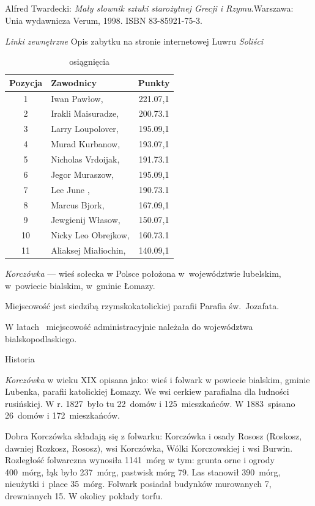 \documentclass[a4paper,12pt]{article}
\begin{document}
\subsection{}\label{sec:tekst} 
Alfred Twardecki: \emph {Mały słownik sztuki starożytnej Grecji i Rzymu}.Warszawa: Unia wydawnicza Verum, 1998. ISBN 83-85921-75-3.

\emph{Linki zewnętrzne}
Opis zabytku na stronie internetowej Luwru
\emph{Soliści}
\begin{table}[h]
\begin{tabular}{clc}
\hline
\textbf{Pozycja}&\textbf{Zawodnicy}&\textbf{Punkty}\\
\hline
1&Iwan Pawłow{,}&221.07{,}1\\
2&Irakli Maisuradze{,}&200.73{.}1\\
3&Larry Loupolover{,}&195.09{,}1\\
4&Murad Kurbanow{,}&193.07{,}1\\
5&Nicholas Vrdoijak{,}&191.73{.}1\\
6&Jegor Muraszow{,}&195.09{,}1\\
7&Lee June {,}&190.73{.}1\\
8&Marcus Bjork{,}&167.09{,}1\\
9&Jewgienij Własow{,}&150.07{,}1\\
10&Nicky Leo Obrejkow{,}&160.73{.}1\\
11&Aliaksej Miałiochin{,}&140.09{,}1\\
\hline
\end{tabular}
\caption{osiągnięcia}
\end{table}

\emph{Korczówka} --- wieś sołecka w Polsce położona w~województwie lubelskim, w~powiecie bialskim, w~gminie Łomazy.

Miejscowość jest siedzibą rzymskokatolickiej parafii Parafia św.~Jozafata.

W latach ~miejscowość administracyjnie należała do województwa bialskopodlaskiego.


Historia

\emph  {Korczówka} w wieku XIX opisana jako: wieś i folwark w powiecie bialskim, gminie Lubenka, parafii katolickiej Łomazy. We wsi cerkiew parafialna dla ludności rusińskiej.
W r. 1827~było tu 22~domów i 125~mieszkańców. W 1883~spisano 26~domów i 172~mieszkańców.

Dobra Korczówka składają się z folwarku: Korczówka i osady Rososz (Roskosz, dawniej Rozkosz, Rososz), wsi Korczówka, Wólki Korczowskiej i wsi Burwin. Rozległość folwarczna wynosiła 1141~mórg w tym: grunta orne i ogrody 400~mórg, łąk było 237~mórg, pastwisk mórg 79. Las stanowił 390~mórg, nieużytki i~place 35~mórg. Folwark posiadał budynków murowanych 7, drewnianych 15. W okolicy pokłady torfu.
\end{document}
